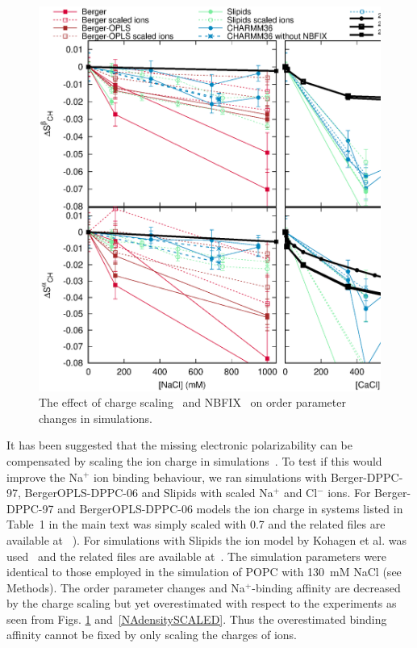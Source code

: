 \documentclass[twoside,twocolumn,9pt]{article}
\begin{document}
\begin{figure}[t]
  \centering
  \includegraphics[width=16cm]{../Fig/OrderParameterIONSchangesSCALED.eps} 
  \caption{\label{OPchangesSCALED}
    The effect of charge scaling~\cite{leontyev11,kohagen14} and NBFIX~\cite{venable13} on order parameter changes in simulations. 
    }
\end{figure}

It has been suggested that the missing electronic polarizability 
can be compensated by scaling the ion charge in simulations~\cite{leontyev11}. 
To test if this would improve the Na$^+$ ion binding behaviour, we ran simulations with Berger-DPPC-97, BergerOPLS-DPPC-06
and Slipids with scaled Na$^+$ and Cl$^-$ ions. For Berger-DPPC-97 and BergerOPLS-DPPC-06 models 
the ion charge in systems listed in Table~1 in the main text was simply scaled with 0.7 and
the related files are available 
at ~\cite{DPPCBergerNaCl150mMscaled,DPPCBergerNaCl1000mMscaled,DPPCBergerOPLS06NaCl150mMscaled,DPPCBergerOPLS06NaCl1000mMscaled}). 
For simulations with Slipids the ion model by Kohagen et al. was used~\cite{kohagen16} and the related files are 
available at~\cite{slipidsFILESpopcSCALED}. The simulation parameters were identical to those employed in the simulation of POPC with 130~mM NaCl (see Methods).
The order parameter changes and Na$^+$-binding affinity are decreased by the charge scaling but 
yet overestimated with respect to the experiments as seen from Figs. \ref{OPchangesSCALED} and~\ref{NAdensitySCALED}. 
Thus the overestimated binding affinity cannot be fixed by only scaling the charges of ions.
\end{document}
